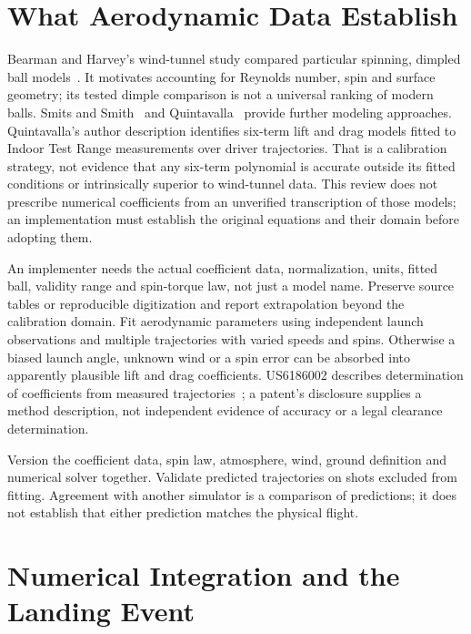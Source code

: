 \section{What Aerodynamic Data Establish}

Bearman and Harvey's wind-tunnel study compared particular spinning, dimpled ball models~\cite{bearmanharvey}.
It motivates accounting for Reynolds number, spin and surface geometry; its tested dimple comparison is not a universal ranking of modern balls.
Smits and Smith~\cite{smitssmith} and Quintavalla~\cite{quintavalla} provide further modeling approaches.
Quintavalla's author description identifies six-term lift and drag models fitted to Indoor Test Range measurements over driver trajectories.
That is a calibration strategy, not evidence that any six-term polynomial is accurate outside its fitted conditions or intrinsically superior to wind-tunnel data.
This review does not prescribe numerical coefficients from an unverified transcription of those models; an implementation must establish the original equations and their domain before adopting them.

An implementer needs the actual coefficient data, normalization, units, fitted ball, validity range and spin-torque law, not just a model name.
Preserve source tables or reproducible digitization and report extrapolation beyond the calibration domain.
Fit aerodynamic parameters using independent launch observations and multiple trajectories with varied speeds and spins.
Otherwise a biased launch angle, unknown wind or a spin error can be absorbed into apparently plausible lift and drag coefficients.
US6186002 describes determination of coefficients from measured trajectories~\cite{us6186002}; a patent's disclosure supplies a method description, not independent evidence of accuracy or a legal clearance determination.

\begin{implication}
Version the coefficient data, spin law, atmosphere, wind, ground definition and numerical solver together.
Validate predicted trajectories on shots excluded from fitting.
Agreement with another simulator is a comparison of predictions; it does not establish that either prediction matches the physical flight.
\end{implication}

\section{Numerical Integration and the Landing Event}

